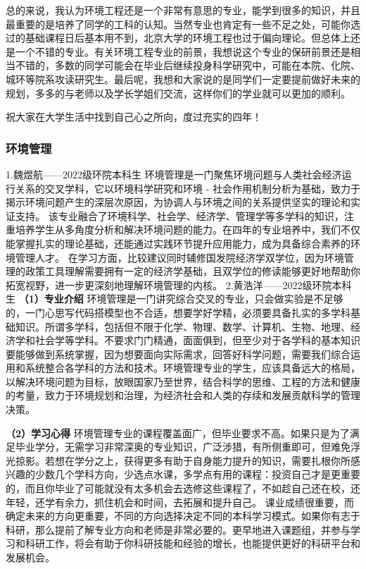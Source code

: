 \documentclass[11pt,oneside]{book}
\begin{document}
总的来说，我认为环境工程还是一个非常有意思的专业，能学到很多的知识，并且最重要的是培养了同学的工科的认知。当然专业也肯定有一些不足之处，可能你选过的基础课程日后基本用不到，北京大学的环境工程也过于偏向理论。但总体上还是一个不错的专业。有关环境工程专业的前景，我想说这个专业的保研前景还是相当不错的，多数的同学可能会在毕业后继续投身科学研究中，可能在本院、化院、城环等院系攻读研究生。最后呢，我想和大家说的是同学们一定要提前做好未来的规划，多多的与老师以及学长学姐们交流，这样你们的学业就可以更加的顺利。

祝大家在大学生活中找到自己心之所向，度过充实的四年！

\subsubsection{环境管理}
1.魏煜航——2022级环院本科生
环境管理是一门聚焦环境问题与人类社会经济运行关系的交叉学科，它以环境科学研究和环境 - 社会作用机制分析为基础，致力于揭示环境问题产生的深层次原因，为协调人与环境之间的关系提供坚实的理论和实证支持。
该专业融合了环境科学、社会学、经济学、管理学等多学科的知识，注重培养学生从多角度分析和解决环境问题的能力。在四年的专业培养中，我们不仅能掌握扎实的理论基础，还能通过实践环节提升应用能力，成为具备综合素养的环境管理人才。
在学习方面，比较建议同时辅修国发院经济学双学位，因为环境管理的政策工具理解需要拥有一定的经济学基础，且双学位的修读能够更好地帮助你拓宽视野，进一步更深刻地理解环境管理的内核。
2.黄浩洋——2022级环院本科生
\textbf{（1）专业介绍}
环境管理是一门讲究综合交叉的专业，只会做实验是不足够的，一门心思写代码搭模型也不合适，想要学好学精，必须要具备扎实的多学科基础知识。所谓多学科，包括但不限于化学、物理、数学、计算机、生物、地理、经济学和社会学等学科。不要求门门精通，面面俱到，但至少对于各学科的基本知识要能够做到系统掌握，因为想要面向实际需求，回答好科学问题，需要我们综合运用和系统整合各学科的方法和技术。环境管理专业的学生，应该具备远大的格局，以解决环境问题为目标，放眼国家乃至世界，结合科学的思维、工程的方法和健康的考量，致力于环境规划和治理，为经济社会和人类的存续和发展贡献科学的管理决策。

\textbf{（2）学习心得}
环境管理专业的课程覆盖面广，但毕业要求不高。如果只是为了满足毕业学分，无需学习非常深奥的专业知识，广泛涉猎，有所侧重即可，但难免浮光掠影。若想在学分之上，获得更多有助于自身能力提升的知识，需要扎根你所感兴趣的少数几个学科方向，少选点水课，多学点有用的课程：投资自己才是更重要的，而且你毕业了可能就没有太多机会去选修这些课程了，不如趁自己还在校，还年轻，还学有余力，抓住机会和时间，去拓展和提升自己。
课业成绩很重要，而确定未来的方向更重要，不同的方向选择决定不同的本科学习模式。如果你有志于科研，那么提前了解专业方向和老师是非常必要的。更早地进入课题组，并参与学习和科研工作，将会有助于你科研技能和经验的增长，也能提供更好的科研平台和发展机会。
\end{document}
